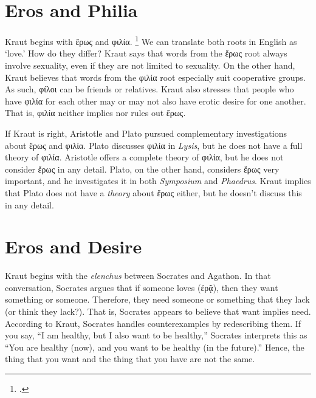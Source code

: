 \documentclass[12pt,letterpaper]{article}
\newcommand{\MONTH}{%
  \ifcase\the\month
  \or January%
  \or February%
  \or March%
  \or April%
  \or May%
  \or June%
  \or July%
  \or August%
  \or September%
  \or October%
  \or November%
  \or December%
  \fi}
\begin{document}

\pagestyle{notes}

\section*{Eros and Philia}

Kraut begins with \textgreek{ἔρως} and \textgreek{φιλία}.%
\footcite{kraut-plato-on-love-2019}
We can translate both roots in English as `love.'
How do they differ?
Kraut says that words from the \textgreek{ἔρως} root always involve sexuality, even if they are not limited to sexuality.
On the other hand, Kraut believes that words from the \textgreek{φιλία} root especially suit cooperative groups.
As such, \textgreek{φίλοι} can be friends or relatives.
Kraut also stresses that people who have \textgreek{φιλία} for each other may or may not also have erotic desire for one another.
That is, \textgreek{φιλία} neither implies nor rules out \textgreek{ἔρως}.

If Kraut is right, Aristotle and Plato pursued complementary investigations about \textgreek{ἔρως} and \textgreek{φιλία}.
Plato discusses \textgreek{φιλία} in \textit{Lysis}, but he does not have a full theory of \textgreek{φιλία}.
Aristotle offers a complete theory of \textgreek{φιλία}, but he does not consider \textgreek{ἔρως} in any detail.
Plato, on the other hand, considers \textgreek{ἔρως} very important, and he investigates it in both \textit{Symposium} and \textit{Phaedrus}.
Kraut implies that Plato does not have a \textit{theory} about \textgreek{ἔρως} either, but he doesn't discuss this in any detail.

\section*{Eros and Desire}

Kraut begins with the \textit{elenchus} between Socrates and Agathon.
In that conversation, Socrates argues that if someone loves (\textgreek{ἐρᾷ}), then they want something or someone.
Therefore, they need someone or something that they lack (or think they lack?).
That is, Socrates appears to believe that want implies need.
According to Kraut, Socrates handles counterexamples by redescribing them.
If you say, ``I am healthy, but I also want to be healthy,'' Socrates interprets this as ``You are healthy (now), and you want to be healthy (in the future).''
Hence, the thing that you want and the thing that you have are not the same.
\end{document}
